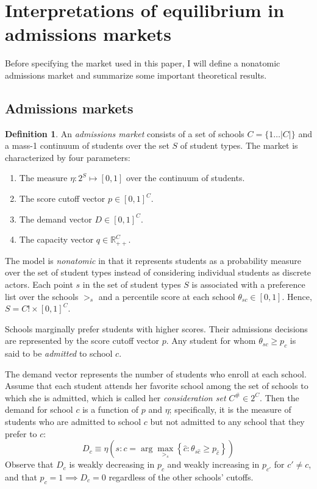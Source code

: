 \documentclass[12pt]{article}
\theoremstyle{definition}
\newtheorem{definition}{Definition}
\begin{document}
\section{Interpretations of equilibrium in admissions markets} \label{interpeqinadmmkts}
Before specifying the market used in this paper, I will define a nonatomic admissions market and summarize some important theoretical results.

\subsection{Admissions markets}
\begin{definition} An \emph{admissions market} consists of a set of schools $C = \{ 1\dots |C| \}$ and a mass-1 continuum of students over the set $S$ of student types. The market is characterized by four parameters:
\begin{enumerate}
\item The measure $\eta: 2^S \mapsto [0, 1]$ over the continuum of students.
\item The score cutoff vector $p \in [0, 1]^C$. 
\item The demand vector $D \in [0, 1]^C$.
\item The capacity vector $q \in \mathbb{R}_{++}^C$.
\end{enumerate}
\end{definition}

The model is \emph{nonatomic} in that it represents students as a probability measure over the set of student types instead of considering individual students as discrete actors. Each point $s$ in the set of student types $S$ is associated with a preference list over the schools $>_s$ and a percentile score at each school $\theta_{sc} \in [0,1]$. Hence, $S = C! \times [0, 1]^C$. 

Schools marginally prefer students with higher scores. Their admissions decisions are represented by the score cutoff vector $p$. Any student for whom $\theta_{sc} \geq p_c$ is said to be \emph{admitted} to school $c$. 

The demand vector represents the number of students who enroll at each school. Assume that each student attends her favorite school among the set of schools to which she is admitted, which is called her \emph{consideration set} $C^\# \in 2^C$. Then the demand for school $c$ is a function of $p$ and $\eta$; specifically, it is the measure of students who are admitted to school $c$ but not admitted to any school that they prefer to $c$:
\begin{equation} \label{demanddefinition}
D_c \equiv \eta\left(s: c = \arg \max_{>_s} \left\{\hat c: \theta_{s\hat c} \geq p_{\hat c} \right\}\right)
\end{equation}
Observe that $D_c$ is weakly decreasing in $p_c$ and weakly increasing in $p_{c'}$ for $c' \neq c$, and that $p_c = 1 \implies D_c = 0$ regardless of the other schools' cutoffs.
\end{document}

